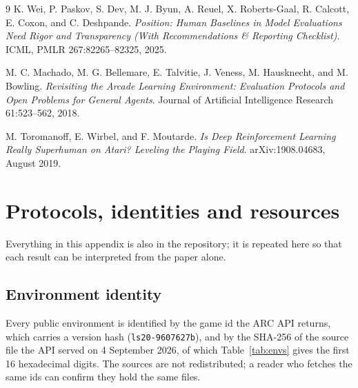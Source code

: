 \documentclass[11pt]{article}
\newcommand{\code}[1]{\texttt{#1}}
\begin{document}
\begin{thebibliography}{9}
K. Wei, P. Paskov, S. Dev, M. J. Byun, A. Reuel, X. Roberts-Gaal, R. Calcott,
E. Coxon, and C. Deshpande.
\emph{Position: Human Baselines in Model Evaluations Need Rigor and
Transparency (With Recommendations \& Reporting Checklist)}.
ICML, PMLR 267:82265--82325, 2025.

M. C. Machado, M. G. Bellemare, E. Talvitie, J. Veness, M. Hausknecht, and
M. Bowling.
\emph{Revisiting the Arcade Learning Environment: Evaluation Protocols and Open
Problems for General Agents}.
Journal of Artificial Intelligence Research 61:523--562, 2018.

M. Toromanoff, E. Wirbel, and F. Moutarde.
\emph{Is Deep Reinforcement Learning Really Superhuman on Atari? Leveling the
Playing Field}.
arXiv:1908.04683, August 2019.

\end{thebibliography}

\appendix
\section{Protocols, identities and resources}
\label{app:protocol}

Everything in this appendix is also in the repository; it is repeated here so
that each result can be interpreted from the paper alone.

\subsection{Environment identity}

Every public environment is identified by the game id the ARC API returns,
which carries a version hash (\code{ls20-9607627b}), and by the SHA-256 of the
source file the API served on 4 September 2026, of which Table~\ref{tab:envs} gives the
first 16 hexadecimal digits. The sources are not redistributed; a reader
who fetches the same ids can confirm they hold the same files.
\end{document}
